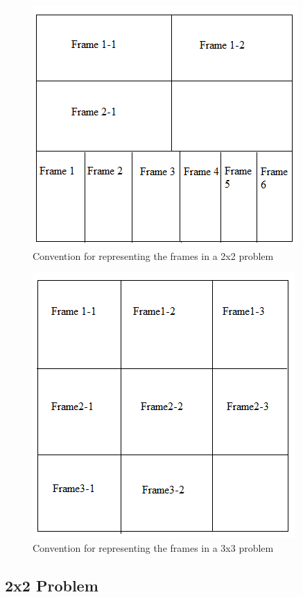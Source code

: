 \documentclass[10pt, letter]{article}
\begin{document}
\begin{figure}[h!]
  \centering
    \includegraphics[scale = 0.4]{Images/Fig4}
    \caption{Convention for representing the frames in a 2x2 problem}
  \label{fig4}
\end{figure}

\begin{figure}[h!]
  \centering
    \includegraphics[scale = 0.4]{Images/Fig5}
    \caption{Convention for representing the frames in a 3x3 problem}
  \label{fig5}
\end{figure}


\subsection*{2x2 Problem}
\end{document}
